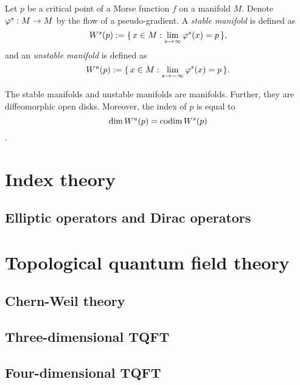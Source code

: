 \documentclass{../note}
\begin{document}
\begin{defn}
Let $p$ be a critical point of a Morse function $f$ on a manifold $M$.
Denote $\varphi^s:M\to M$ by the flow of a pseudo-gradient.
A \emph{stable manifold} is defined as
\[W^s(p):=\{\,x\in M:\lim_{s\to\infty}\varphi^s(x)=p\,\},\]
and an \emph{unstable manifold} is defined as
\[W^u(p):=\{\,x\in M:\lim_{s\to-\infty}\varphi^s(x)=p\,\}.\]
\end{defn}
\begin{prop}
The stable manifolds and unstable manifolds are manifolds.
Further, they are diffeomorphic open disks.
Moreover, the index of $p$ is equal to
\[\dim W^u(p)=\operatorname{codim} W^s(p)\].
\end{prop}


\chapter{}
\chapter{}


\part{Index theory}
\chapter{Elliptic operators and Dirac operators}
\chapter{}
\chapter{}

\part{Topological quantum field theory}
\chapter{Chern-Weil theory}
\chapter{Three-dimensional TQFT}
\chapter{Four-dimensional TQFT}
\end{document}
